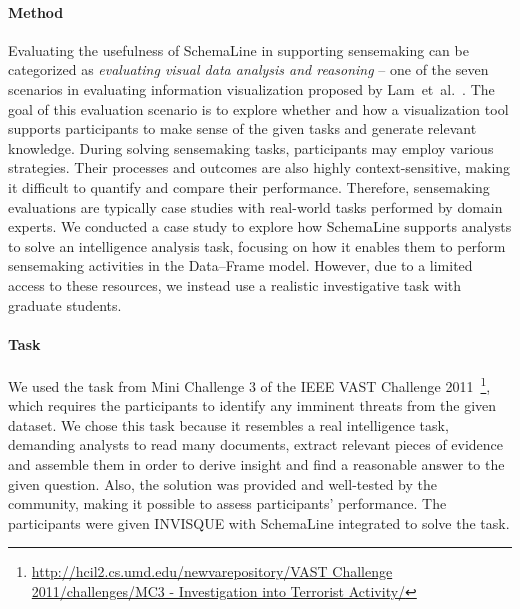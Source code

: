 \paragraph{Method}
Evaluating the usefulness of SchemaLine in supporting sensemaking can be categorized as \emph{evaluating visual data analysis and reasoning} -- one of the seven scenarios in evaluating information visualization proposed by Lam~et~al.~\cite{Lam2012}. The goal of this evaluation scenario is to explore whether and how a visualization tool supports participants to make sense of the given tasks and generate relevant knowledge. During solving sensemaking tasks, participants may employ various strategies. Their processes and outcomes are also highly context-sensitive, making it difficult to quantify and compare their performance. Therefore, sensemaking evaluations are typically case studies with real-world tasks performed by domain experts. We conducted a case study to explore how SchemaLine supports analysts to solve an intelligence analysis task, focusing on how it enables them to perform sensemaking activities in the Data--Frame model. However, due to a limited access to these resources, we instead use a realistic investigative task with graduate students.

\paragraph{Task}
We used the task from Mini Challenge 3 of the IEEE VAST Challenge 2011~\footnote{\url{http://hcil2.cs.umd.edu/newvarepository/VAST Challenge 2011/challenges/MC3 - Investigation into Terrorist Activity/}}, which requires the participants to identify any imminent threats from the given dataset. We chose this task because it resembles a real intelligence task, demanding analysts to read many documents, extract relevant pieces of evidence and assemble them in order to derive insight and find a reasonable answer to the given question. Also, the solution was provided and well-tested by the community, making it possible to assess participants' performance. The participants were given INVISQUE with SchemaLine integrated to solve the task. 


